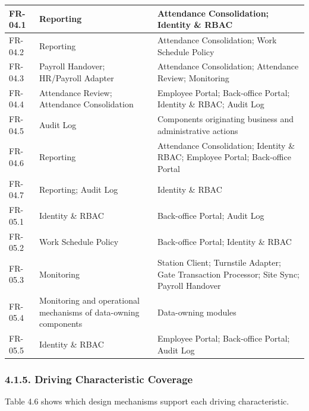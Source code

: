\begin{longtable}{|>{\raggedright\arraybackslash}p{41.5pt}|>{\raggedright\arraybackslash}p{187.5pt}|>{\raggedright\arraybackslash}p{179.5pt}|}
\hline
FR-04.1 & Reporting & Attendance Consolidation; Identity \& RBAC \\
\hline
FR-04.2 & Reporting & Attendance Consolidation; Work Schedule Policy \\
\hline
FR-04.3 & Payroll Handover; HR/Payroll Adapter & Attendance Consolidation; Attendance Review; Monitoring \\
\hline
FR-04.4 & Attendance Review; Attendance Consolidation & Employee Portal; Back-office Portal; Identity \& RBAC; Audit Log \\
\hline
FR-04.5 & Audit Log & Components originating business and administrative actions \\
\hline
FR-04.6 & Reporting & Attendance Consolidation; Identity \& RBAC; Employee Portal; Back-office Portal \\
\hline
FR-04.7 & Reporting; Audit Log & Identity \& RBAC \\
\hline
FR-05.1 & Identity \& RBAC & Back-office Portal; Audit Log \\
\hline
FR-05.2 & Work Schedule Policy & Back-office Portal; Identity \& RBAC \\
\hline
FR-05.3 & Monitoring & Station Client; Turnstile Adapter; Gate Transaction Processor; Site Sync; Payroll Handover \\
\hline
FR-05.4 & Monitoring and operational mechanisms of data-owning components & Data-owning modules \\*
\hline\noalign{\nobreak}
FR-05.5 & Identity \& RBAC & Employee Portal; Back-office Portal; Audit Log \\
\hline
\end{longtable}


\subsubsection*{4.1.5. Driving Characteristic Coverage}

{}


Table 4.6 shows which design mechanisms support each driving characteristic.

